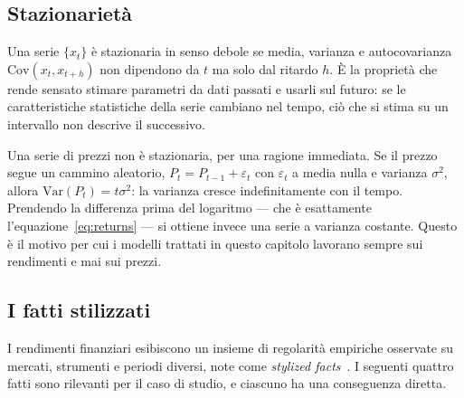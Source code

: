 \subsection{Stazionarietà}

Una serie $\{x_t\}$ è stazionaria in senso debole se media, varianza e autocovarianza $\mathrm{Cov}(x_t,x_{t+h})$ non dipendono da $t$ ma solo dal ritardo $h$. È la proprietà che rende sensato stimare parametri da dati passati e usarli sul futuro: se le caratteristiche statistiche della serie cambiano nel tempo, ciò che si stima su un intervallo non descrive il successivo.

Una serie di prezzi non è stazionaria, per una ragione immediata. Se il prezzo segue un cammino aleatorio, $P_t = P_{t-1} + \varepsilon_t$ con $\varepsilon_t$ a media nulla e varianza $\sigma^2$, allora $\mathrm{Var}(P_t) = t\sigma^2$: la varianza cresce indefinitamente con il tempo. Prendendo la differenza prima del logaritmo — che è esattamente l'equazione~\eqref{eq:returns} — si ottiene invece una serie a varianza costante. Questo è il motivo per cui i modelli trattati in questo capitolo lavorano sempre sui rendimenti e mai sui prezzi.
\subsection{I fatti stilizzati}

I rendimenti finanziari esibiscono un insieme di regolarità empiriche osservate su mercati, strumenti e periodi diversi, note come \emph{stylized facts}~\cite{cont2001empirical}. I seguenti quattro fatti sono rilevanti per il caso di studio, e ciascuno ha una conseguenza diretta.

